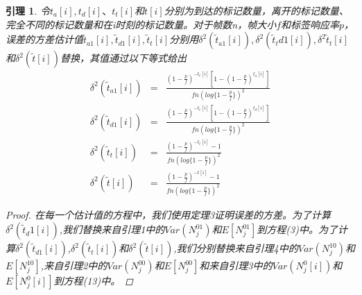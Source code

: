 \documentclass[UTF8]{ctexart}
\newtheorem{lemma}{引理}
\newtheorem*{proof}{证明}
\begin{document}
\begin{lemma}
	令$t_a[i],t_d[i]、t_t[i]$和$t[i]$分别为到达的标记数量，离开的标记数量、完全不同的标记数量和在i时刻的标记数量。对于帧数n，帧大小$f$和标签响应率$p$，误差的方差估计值$\widetilde{t}_{a1}[i],\widetilde{t}_{d1}[i],\widetilde{t}_t[i]$分别用$\delta^2(\widetilde{t}_{a1}[i]),\delta^2(\widetilde{t}_t{d1}[i]),\delta^2{\widetilde{t}_t[i]}$和$\delta^2(\widetilde{t}[i])$替换，其值通过以下等式给出
	\begin{eqnarray*}
		\delta^2(\widetilde{t}_{a1}[i])&=&\frac{(1-\frac{p}{f})^{-t_t[i]}[1-(1-\frac{p}{f})^{t_a[i]}]}{fn(log\{1-\frac{p}{f}\})^2}\\
		\delta^2(\widetilde{t}_{d1}[i])&=&\frac{(1-\frac{p}{f})^{-t_t[i]}[1-(1-\frac{p}{f})^{t_d[i]}]}{fn(log\{1-\frac{p}{f}\})^2}\\
		\delta^2(\widetilde{t}_t[i])&=&\frac{(1-\frac{p}{f})^{-t_t[i]}-1}{fn(log\{1-\frac{p}{f}\})^2}\\
		\delta^2(\widetilde{t}[i])&=&\frac{(1-\frac{p}{f})^{-t[i]}-1}{fn(log\{1-\frac{p}{f}\})^2}
	\end{eqnarray*}
	\begin{proof}
		在每一个估计值的方程中，我们使用定理3证明误差的方差。为了计算$\delta^2(\widetilde{t}_d1[i])$,我们替换来自引理1中的$Var(N^{01}_j)$和$E[N^{01}_j]$到方程(3)中。为了计算$\delta^2(\widetilde{t}_{d1}[i])$,$\delta^2(\widetilde{t}_t[i])$和$\delta^2(\widetilde{t}[i])$,我们分别替换来自引理4中的$Var(N^{10}_j)$和$E[N^{10}_j]$,来自引理2中的$Var(N^{00}_j)$和$E[N^{00}_j]$和来自引理3中的$Var(N^0_j[i])$和$E[N^0_j[i]]$到方程(13)中。
	\end{proof}
\end{lemma}
\end{document}
